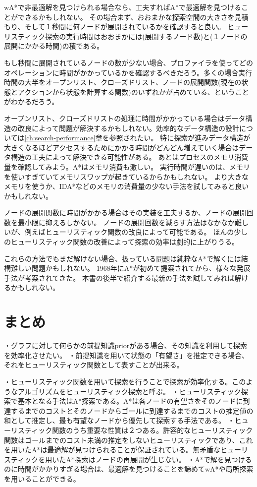 wA*で非最適解を見つけられる場合なら、工夫すればA*で最適解を見つけることができるかもしれない。
その場合まず、おおまかな探索空間の大きさを見積もり、そして１秒間に何ノードが展開されているかを確認すると良い。
ヒューリスティック探索の実行時間はおおまかには(展開するノード数)と(１ノードの展開にかかる時間)の積である。

もし秒間に展開されているノードの数が少ない場合、プロファイラを使ってどのオペレーションに時間がかかっているかを確認するべきだろう。多くの場合実行時間の大半をオープンリスト、クローズドリスト、ノードの展開関数(現在の状態とアクションから状態を計算する関数)のいずれかが占めている、ということがわかるだろう。

オープンリスト、クローズドリストの処理に時間がかかっている場合はデータ構造の改良によって問題が解決するかもしれない。効率的なデータ構造の設計については\ref{ch:search-performance}章を参照されたい。
特に探索が進みデータ構造が大きくなるほどアクセスするためにかかる時間がどんどん増えていく場合はデータ構造の工夫によって解決できる可能性がある。
あとはプロセスのメモリ消費量を確認してみよう。A*はメモリ消費も激しい。
実行時間が遅いのは、メモリを使いすぎていてメモリスワップが起きているからかもしれない。
より大きなメモリを使うか、IDA*などのメモリの消費量の少ない手法を試してみると良いかもしれない。

ノードの展開関数に時間がかかる場合はその実装を工夫するか、ノードの展開回数を最小限に抑えるしかない。
ノードの展開回数を減らす方法はなかなか難しいが、例えばヒューリスティック関数の改良によって可能である。
ほんの少しのヒューリスティック関数の改善によって探索の効率は劇的に上がりうる。

これらの方法でもまだ解けない場合、扱っている問題は純粋なA*で解くには結構難しい問題かもしれない。
1968年にA*が初めて提案されてから、様々な発展手法が考案されてきた。
本書の後半で紹介する最新の手法を試してみれば解けるかもしれない。

\section{まとめ}

・グラフに対して何らかの前提知識priorがある場合、その知識を利用して探索を効率化させたい。
・前提知識を用いて状態の「有望さ」を推定できる場合、それをヒューリスティック関数として表すことが出来る。

・ヒューリスティック関数を用いて探索を行うことで探索が効率化する。このようなアルゴリズムをヒューリスティック探索と呼ぶ。
・ヒューリスティック探索で基本となる手法はA*探索である。A*は各ノードの有望さをそのノードに到達するまでのコストとそのノードからゴールに到達するまでのコストの推定値の和として推定し、最も有望なノードから優先して探索する手法である。
・ヒューリスティック関数のうち重要な性質は２つある。許容的なヒューリスティック関数はゴールまでのコスト未満の推定をしないヒューリスティックであり、これを用いたA*は最適解が見つけられることが保証されている。無矛盾なヒューリスティックを用いたA*探索はノードの再展開が生じない。
・A*で解を見つけるのに時間がかかりすぎる場合は、最適解を見つけることを諦めてwA*や局所探索を用いることができる。

